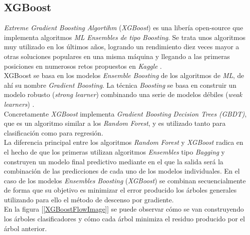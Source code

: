         \subsection {XGBoost}

            
            \textit{Extreme Gradient Boosting Algortihm} (\textit{XGBoost}) es una libería open-source que implementa algoritmos \textit{ML Ensembles de tipo Boosting}. Se trata unos algoritmos muy utilizado en los últimos años, logrando un rendimiento diez veces mayor a otras soluciones populares en una misma máquina y llegando a las primeras posiciones en numerosos retos propuestos en \textit{Kaggle} \cite{XGBoostTutorial}.\\

            XGBoost se basa en los modelos \textit{Ensemble Boosting} de los algoritmos de \textit{ML}, de ahí su nombre \textit{Gradient Boosting}. La técnica \textit{Boosting} se basa en construir un modelo robusto (\textit{strong learner}) combinando una serie de modelos débiles (\textit{weak learners}) \cite{NvidiaXGBoost}.\\


            Concretamente \textit{XGBoost} implementa \textit{Gradient Boosting Decision Trees (GBDT)}, que es un algoritmo similar a los \textit{Random Forest}, y es utilizado tanto para clasificación como para regresión.\\

            La diferencia principal entre los algoritmos \textit{Random Forest} y \textit{XGBoost} radica en el hecho de que los primeras utilizan algoritmos \textit{Ensembles} tipo \textit{Bagging} y construyen un modelo final predictivo mediante en el que la salida será la combinación de las predicciones de cada uno de los modelos individuales. En el caso de los modelos \textit{Ensembles Boosting} (\textit{XGBoost}) se combinan secuencialmente de forma que su objetivo es minimizar el error producido los árboles generales utilizando para ello el método de descenso por gradiente.\\


            En la figura [\ref{XGBoostFlowImage}] se puede observar cómo se van construyendo los árboles clasificadores y cómo cada árbol minimiza el residuo producido por el árbol anterior.\\


